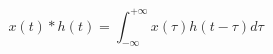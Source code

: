 \documentclass{article}
\begin{document}
\begin{equation*}
    x(t)*h(t)=\int_{-\infty}^{+\infty}x(\tau)h(t-\tau)d\tau
\end{equation*}
\end{document}
